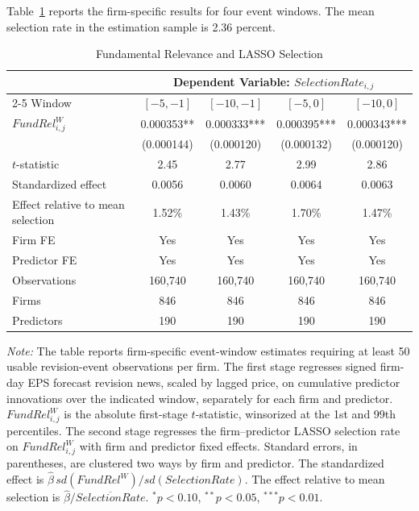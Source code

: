 Table~\ref{tab:fundamental_relevance_selection} reports the firm-specific results for four event windows. The mean selection rate in the estimation sample is 2.36 percent.

\begin{table}[H]
\centering
\caption{Fundamental Relevance and LASSO Selection}
\label{tab:fundamental_relevance_selection}
\begin{tabular}{lcccc}
\toprule
& \multicolumn{4}{c}{Dependent Variable: $SelectionRate_{i,j}$} \\
\cmidrule(lr){2-5}
Window & $[-5,-1]$ & $[-10,-1]$ & $[-5,0]$ & $[-10,0]$ \\
\midrule
$FundRel^W_{i,j}$
    & 0.000353** & 0.000333*** & 0.000395*** & 0.000343*** \\
    & (0.000144) & (0.000120) & (0.000132) & (0.000120) \\
\midrule
$t$-statistic
    & 2.45 & 2.77 & 2.99 & 2.86 \\
Standardized effect
    & 0.0056 & 0.0060 & 0.0064 & 0.0063 \\
Effect relative to mean selection
    & 1.52\% & 1.43\% & 1.70\% & 1.47\% \\
\midrule
Firm FE
    & Yes & Yes & Yes & Yes \\
Predictor FE
    & Yes & Yes & Yes & Yes \\
Observations
    & 160{,}740 & 160{,}740 & 160{,}740 & 160{,}740 \\
Firms
    & 846 & 846 & 846 & 846 \\
Predictors
    & 190 & 190 & 190 & 190 \\
\bottomrule
\end{tabular}

\vspace{0.15cm}
\begin{minipage}{0.95\textwidth}
\footnotesize
\textit{Note:} The table reports firm-specific event-window estimates requiring at least 50 usable revision-event observations per firm. The first stage regresses signed firm-day EPS forecast revision news, scaled by lagged price, on cumulative predictor innovations over the indicated window, separately for each firm and predictor. $FundRel^W_{i,j}$ is the absolute first-stage $t$-statistic, winsorized at the 1st and 99th percentiles. The second stage regresses the firm--predictor LASSO selection rate on $FundRel^W_{i,j}$ with firm and predictor fixed effects. Standard errors, in parentheses, are clustered two ways by firm and predictor. The standardized effect is $\hat\beta\,sd(FundRel^W)/sd(SelectionRate)$. The effect relative to mean selection is $\hat\beta/\overline{SelectionRate}$. $^{*}p<0.10$, $^{**}p<0.05$, $^{***}p<0.01$.
\end{minipage}
\end{table}

